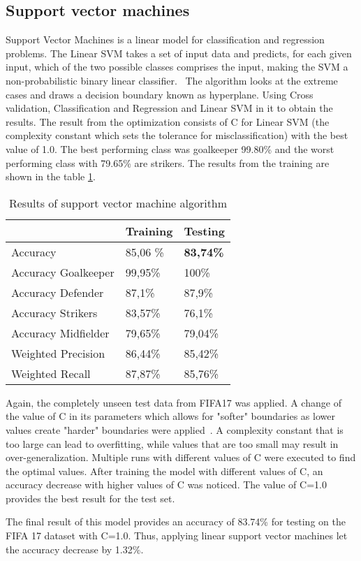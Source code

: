 \subsection{Support vector machines}

Support Vector Machines is a linear model for classification and regression problems. The Linear SVM takes a set of input data and predicts, for each given input, which of the two possible classes comprises the input, making the SVM a non-probabilistic binary linear classifier.~\cite{ref_rapidminersvm} \newline The algorithm looks at the extreme cases and draws a decision boundary known as hyperplane. Using Cross validation, Classification and Regression and Linear SVM in it to obtain the results. The result from the optimization consists of C for Linear SVM (the complexity constant which sets the tolerance for misclassification) with the best value of 1.0. The best performing class was goalkeeper 99.80\% and the worst performing class with 79.65\% are strikers. The results from the training are shown in the table \ref{Tab:SVM}.

\begin{table}[]
\begin{tabular}{@{}l|ll@{}}
\toprule
                    & Training & Testing \\ \midrule
Accuracy            & 85,06 \% & \textbf{83,74\%} \\ \midrule
Accuracy Goalkeeper & 99,95\%  & 100\%   \\
Accuracy Defender   & 87,1\%   & 87,9\%  \\
Accuracy Strikers   & 83,57\%  & 76,1\%  \\
Accuracy Midfielder & 79,65\%  & 79,04\% \\ \midrule
Weighted Precision  & 86,44\%  & 85,42\% \\
Weighted Recall     & 87,87\%  & 85,76\% \\ \bottomrule
\end{tabular}
\label{Tab:SVM}
\caption{Results of support vector machine algorithm}
\end{table}
Again, the completely unseen test data from FIFA17 was applied. A change of the value of C in its parameters which allows for "softer" boundaries as lower values create "harder" boundaries were applied~\cite{ref_rapidminersvm2}. A complexity constant that is too large can lead to overfitting, while values that are too small may result in over-generalization. Multiple runs with different values of C were executed to find the optimal values. After training the model  with different values of C, an accuracy decrease with higher values of C was noticed. The value of C=1.0 provides the best result for the test set. 

The final result of this model provides an accuracy of 83.74\% for testing on the FIFA 17 dataset with C=1.0. Thus, applying linear support vector machines let the accuracy decrease by 1.32\%.

